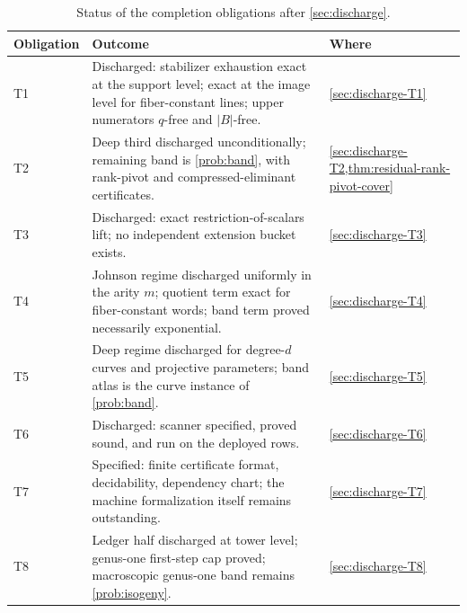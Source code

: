 \documentclass[11pt]{article}
\theoremstyle{definition}
\theoremstyle{remark}
\newcommand{\B}{B}
\begin{document}
\begin{table}[ht]
\centering
\small
\begin{tabular}{@{}lp{8.6cm}l@{}}
\toprule
Obligation & Outcome & Where \\
\midrule
T1 & Discharged: stabilizer exhaustion exact at the support level; exact at the image level for fiber-constant lines; upper numerators $q$-free and $|\B|$-free. & \cref{sec:discharge-T1} \\
T2 & Deep third discharged unconditionally; remaining band is \cref{prob:band}, with rank-pivot and compressed-eliminant certificates. & \cref{sec:discharge-T2,thm:residual-rank-pivot-cover} \\
T3 & Discharged: exact restriction-of-scalars lift; no independent extension bucket exists. & \cref{sec:discharge-T3} \\
T4 & Johnson regime discharged uniformly in the arity $m$; quotient term exact for fiber-constant words; band term proved necessarily exponential. & \cref{sec:discharge-T4} \\
T5 & Deep regime discharged for degree-$d$ curves and projective parameters; band atlas is the curve instance of \cref{prob:band}. & \cref{sec:discharge-T5} \\
T6 & Discharged: scanner specified, proved sound, and run on the deployed rows. & \cref{sec:discharge-T6} \\
T7 & Specified: finite certificate format, decidability, dependency chart; the machine formalization itself remains outstanding. & \cref{sec:discharge-T7} \\
T8 & Ledger half discharged at tower level; genus-one first-step cap proved; macroscopic genus-one band remains \cref{prob:isogeny}. & \cref{sec:discharge-T8} \\
\bottomrule
\end{tabular}
\caption{Status of the completion obligations after \cref{sec:discharge}.}
\label{tab:status}
\end{table}
\end{document}
